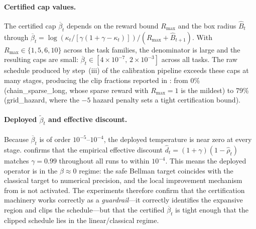 \documentclass{article}
\theoremstyle{remark}
\begin{document}
\paragraph{Certified cap values.}
The certified cap $\overline\beta_t$ depends on the reward bound $R_{\max}$ and the box radius $\hat{B}_t$ through $\overline\beta_t = \log(\kappa_t / [\gamma(1+\gamma-\kappa_t)]) / (R_{\max}+\hat{B}_{t+1})$.
With $R_{\max}\in\{1,5,6,10\}$ across the task families, the denominator is large and the resulting caps are small: $\overline\beta_t\in[4\times10^{-7},\,2\times10^{-3}]$ across all tasks.
The raw schedule produced by step~(iii) of the calibration pipeline exceeds these caps at many stages, producing the clip fractions reported in : from 0\% (chain\_sparse\_long, whose sparse reward with $R_{\max}=1$ is the mildest) to 79\% (grid\_hazard, where the $-5$ hazard penalty sets a tight certification bound).

\paragraph{Deployed $\widetilde\beta_t$ and effective discount.}
Because $\overline\beta_t$ is of order $10^{-5}$--$10^{-4}$, the deployed temperature is near zero at every stage.
 confirms that the empirical effective discount $\hat{d}_t = (1+\gamma)(1-\hat\rho_t)$ matches $\gamma=0.99$ throughout all runs to within $10^{-4}$.
This means the deployed operator is in the $\beta\approx 0$ regime: the safe Bellman target coincides with the classical target to numerical precision, and the local improvement mechanism from  is not activated.
The experiments therefore confirm that the certification machinery works correctly as a \emph{guardrail}---it correctly identifies the expansive region and clips the schedule---but that the certified $\overline\beta_t$ is tight enough that the clipped schedule lies in the linear/classical regime.

\begin{table}[t]
\centering
\small
\caption{Clipping diagnostics: per-task-family mean clip fraction, mean effective discount, and mean deployed $|\widetilde\beta|$ (averaged over stages and seeds).}
\label{tab:clip-activity}

\end{table}
\end{document}
